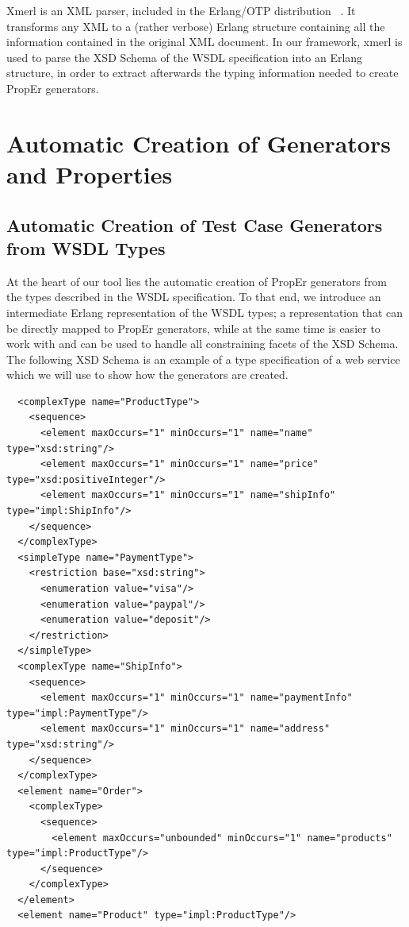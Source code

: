 \documentclass[submission,copyright,a4]{eptcs}
\begin{document}
Xmerl is an XML parser, included in the Erlang/OTP distribution ~\cite{xmerl}.
It transforms any XML to a (rather verbose) Erlang structure containing all the 
information contained in the original XML document. In our framework, xmerl is 
used to parse the XSD Schema of the WSDL specification into an Erlang structure, in 
order to extract afterwards the typing information needed to create PropEr generators.

\section{Automatic Creation of Generators and Properties} \label{sec:automatic}

\subsection{Automatic Creation of Test Case Generators from WSDL Types}

At the heart of our tool lies the automatic creation of PropEr generators from 
the types described in the WSDL specification. To that end, we introduce an 
intermediate Erlang representation of the WSDL types; a representation that can 
be directly mapped to PropEr generators, while at the same time is easier to work 
with and can be used to handle all constraining facets of the XSD Schema. The 
following XSD Schema is an example of a type specification of a web service 
which we will use to show how the generators are created.

\begin{lstlisting}
  <complexType name="ProductType">
    <sequence>
      <element maxOccurs="1" minOccurs="1" name="name" type="xsd:string"/>
      <element maxOccurs="1" minOccurs="1" name="price" type="xsd:positiveInteger"/>
      <element maxOccurs="1" minOccurs="1" name="shipInfo" type="impl:ShipInfo"/>
    </sequence>
  </complexType>
  <simpleType name="PaymentType">
    <restriction base="xsd:string">
      <enumeration value="visa"/>
      <enumeration value="paypal"/>
      <enumeration value="deposit"/>
    </restriction>
  </simpleType>
  <complexType name="ShipInfo">
    <sequence>
      <element maxOccurs="1" minOccurs="1" name="paymentInfo" type="impl:PaymentType"/>
      <element maxOccurs="1" minOccurs="1" name="address" type="xsd:string"/>
    </sequence>
  </complexType>
  <element name="Order">
    <complexType>
      <sequence>
        <element maxOccurs="unbounded" minOccurs="1" name="products" type="impl:ProductType"/>
      </sequence>
    </complexType>
  </element>
  <element name="Product" type="impl:ProductType"/>
\end{lstlisting}
\end{document}
